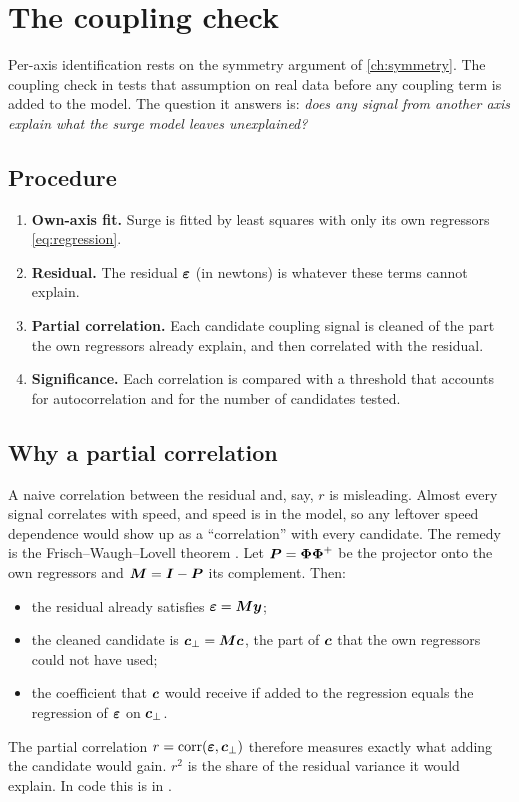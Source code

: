 \chapter{The coupling check}
\label{ch:coupling}

Per-axis identification rests on the symmetry argument of \cref{ch:symmetry}. The coupling check in
 tests that assumption on real data before any coupling term is
added to the model. The question it answers is: \emph{does any signal from another axis explain
what the surge model leaves unexplained?}

\section{Procedure}

\begin{enumerate}
  \item \textbf{Own-axis fit.} Surge is fitted by least squares with only its own regressors
        \eqref{eq:regression}.
  \item \textbf{Residual.} The residual $\boldsymbol{\varepsilon}$ (in newtons) is whatever these terms
        cannot explain.
  \item \textbf{Partial correlation.} Each candidate coupling signal is cleaned of the part the own
        regressors already explain, and then correlated with the residual.
  \item \textbf{Significance.} Each correlation is compared with a threshold that accounts for
        autocorrelation and for the number of candidates tested.
\end{enumerate}

\section{Why a partial correlation}

A naive correlation between the residual and, say, $r$ is misleading. Almost every signal
correlates with speed, and speed is in the model, so any leftover speed dependence would show
up as a ``correlation'' with every candidate. The remedy is the Frisch--Waugh--Lovell theorem
\cite{greene2012}. Let $\boldsymbol{P} = \boldsymbol{\Phi}\boldsymbol{\Phi}^+$ be the projector onto the own
regressors and $\boldsymbol{M} = \boldsymbol{I} - \boldsymbol{P}$ its complement. Then:
\begin{itemize}
  \item the residual already satisfies $\boldsymbol{\varepsilon} = \boldsymbol{M}\boldsymbol{y}$;
  \item the cleaned candidate is $\boldsymbol{c}_\perp = \boldsymbol{M}\boldsymbol{c}$, the part of $\boldsymbol{c}$
        that the own regressors could not have used;
  \item the coefficient that $\boldsymbol{c}$ would receive if added to the regression equals the
        regression of $\boldsymbol{\varepsilon}$ on $\boldsymbol{c}_\perp$.
\end{itemize}
The partial correlation $r = \mathrm{corr}(\boldsymbol{\varepsilon}, \boldsymbol{c}_\perp)$ therefore measures
exactly what adding the candidate would gain. $r^2$ is the share of the residual variance it
would explain. In code this is  in .


